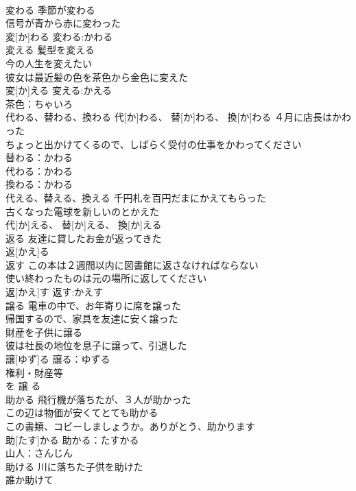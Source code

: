 \documentclass[8pt]{extreport}
\begin{document}
\begin{CJK}{UTF8}{min}
\\	変わる	季節が変わる 
\\	信号が青から赤に変わった 
\\	変[か]わる			変わる:かわる
\\	変える	髪型を変える 
\\	今の人生を変えたい 
\\	彼女は最近髪の色を茶色から金色に変えた 
\\	変[か]える			変える:かえる
\\	茶色：ちゃいろ
\\	代わる、替わる、換わる		代[か]わる、 替[か]わる、 換[か]わる	４月に店長はかわった 
\\	ちょっと出かけてくるので、しばらく受付の仕事をかわってください 
\\	替わる：かわる
\\	代わる：かわる
\\	換わる：かわる
\\	代える、替える、換える	千円札を百円だまにかえてもらった 
\\	古くなった電球を新しいのとかえた 
\\	代[か]える、 替[か]える、 換[か]える						
\\	返る	友達に貸したお金が返ってきた 
\\	返[かえ]る			
\\	返す	この本は２週間以内に図書館に返さなければならない 
\\	使い終わったものは元の場所に返してください 
\\	返[かえ]す			返す:かえす
\\	譲る	電車の中で、お年寄りに席を譲った 
\\	帰国するので、家具を友達に安く譲った 
\\	財産を子供に譲る 
\\	彼は社長の地位を息子に譲って、引退した 
\\	譲[ゆず]る			譲る：ゆずる
\\	権利・財産等 
\\	を 譲 る 
\\	助かる	飛行機が落ちたが、３人が助かった 
\\	この辺は物価が安くてとても助かる 
\\	この書類、コビーしましょうか。ありがとう、助かります 
\\	助[たす]かる			助かる：たすかる
\\	山人：さんじん
\\	助ける	川に落ちた子供を助けた 
\\	誰か助けて 

\end{CJK}
\end{document}
